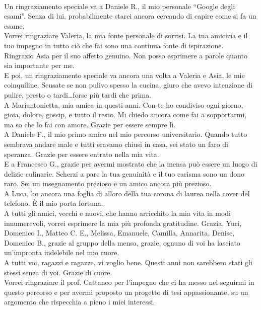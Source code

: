 \begin{flushright}
    \\
    Un ringraziamento speciale va a Daniele R., il mio personale “Google degli esami”. Senza di lui, probabilmente starei ancora cercando di capire come si fa un esame.
    \\
    Vorrei ringraziare Valeria, la mia fonte personale di sorrisi. La tua amicizia e il tuo impegno in tutto ciò che fai sono una continua fonte di ispirazione.
    \\
    Ringrazio Asia per il suo affetto genuino. Non posso esprimere a parole quanto sia importante per me.
    \\
    E poi, un ringraziamento speciale va ancora una volta a Valeria e Asia, le mie coinquiline. Scusate se non pulivo spesso la cucina, giuro che avevo intenzione di pulire, presto o tardi\dots forse più tardi che prima.
    \\
    A Mariantonietta, mia amica in questi anni. Con te ho condiviso ogni giorno, gioia, dolore, gossip, e tutto il resto. Mi chiedo ancora come fai a sopportarmi, ma so che lo fai con amore. Grazie per essere sempre lì.
    \\
    A Daniele F., il mio primo amico nel mio percorso universitario. Quando tutto sembrava andare male e tutti eravamo chiusi in casa, sei stato un faro di speranza. Grazie per essere entrato nella mia vita.
    \\
    E a Francesco G., grazie per avermi mostrato che la mensa può essere un luogo di delizie culinarie. Scherzi a pare la tua genuinità e il tuo carisma sono un dono raro. Sei un insegnamento prezioso e un amico ancora più prezioso.
    \\
    A Luca, ho ancora una foglia di alloro della tua corona di laurea nella cover del telefono. È il mio porta fortuna.
    \\
    A tutti gli amici, vecchi e nuovi, che hanno arricchito la mia vita in modi innumerevoli, vorrei esprimere la mia più profonda gratitudine. Grazia, Yuri, Domenico I., Matteo C. E., Melissa, Emanuele, Camilla, Annarita, Denise, Domenico B., grazie al gruppo della mensa, grazie, ognuno di voi ha lasciato un’impronta indelebile nel mio cuore.
    \\
    A tutti voi, ragazzi e ragazze, vi voglio bene. Questi anni non sarebbero stati gli stessi senza di voi. Grazie di cuore.
    \\
    Vorrei ringraziare il prof. Cattaneo per l'impegno che ci ha messo nel seguirmi in questo percorso e per avermi proposto un progetto di tesi appassionante, su un argomento che rispecchia a pieno i miei interessi.

\end{flushright}
